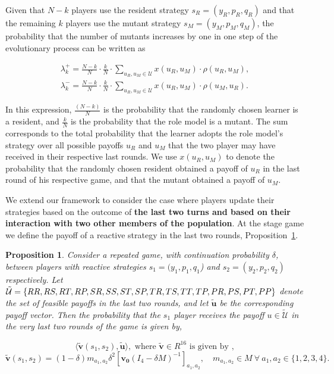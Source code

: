 \documentclass[11pt]{article}
\newcommand{\splitatcommas}[1]{%
  \begingroup
  \begingroup\lccode`~=`, \lowercase{\endgroup
    \edef~{\mathchar\the\mathcode`, \penalty0 \noexpand\hspace{0pt plus 1em}}%
  }\mathcode`,="8000 #1%
  \endgroup
}
\theoremstyle{plainCl1}
\newtheorem{Prop}{Proposition}
\theoremstyle{plainCl2}
\begin{document}
Given that $N\!-\!k$ players use the resident strategy $s_{R}\!=\!(y_{R},p_{R},q_{R})$
and that the remaining $k$ players use the mutant strategy
$s_{M}\!=\!(y_{M},p_{M},q_{M})$, the probability that the number of mutants increases by
one in one step of the evolutionary process can be written as

\begin{align}
\lambda^+_k=\frac{N\!-\!k}{N}\cdot \frac{k}{N}\cdot \sum_{u_{R},u_{M}\in\mathcal{U}} x(u_{R},u_{M})\cdot \rho(u_{R},u_{M}), \\
\lambda^-_k=\frac{N\!-\!k}{N}\cdot \frac{k}{N}\cdot \sum_{u_{R},u_{M}\in\mathcal{U}} x(u_{R},u_{M})\cdot \rho(u_{M},u_{R}).
\end{align}

In this expression, $\frac{(N\!-\!k)}{N}$ is the probability that the randomly chosen
learner is a resident, and $\frac{k}{N}$ is the probability that the role model is a
mutant. The sum corresponds to the total probability that the learner adopts the
role model's strategy over all possible payoffs $u_R$ and $u_M$ that the two
player may have received in their respective last rounds. We use $x(u_R,u_M)$ to
denote the probability that the randomly chosen resident obtained a payoff of
$u_R$ in the last round of his respective game, and that the mutant obtained a
payoff of $u_M$.

We extend our framework to consider the case where players update their
strategies based on the outcome of \textbf{the last two turns and based on their
interaction with two other members of the population}. At the stage game we
define the payoff of a reactive strategy in the last two rounds,
Proposition~\ref{proposition:last_two_rounds}.

\begin{Prop}\label{proposition:last_two_rounds}
  Consider a repeated game, with continuation probability $\delta$, between
  players with reactive strategies $s_1\!=\!(y_1, p_1, q_1$)  and
  $s_2\!=\!(y_2,p_2,q_2)$ respectively. Let $\mathcal{\tilde{U}} =
  \splitatcommas{\{RR, RS, RT, RP, SR, SS, ST, SP, TR, TS, TT, TP, PR, PS, PT,
  PP\}}$ denote the set of feasible payoffs in the last two rounds, and let
  \(\tilde{\mathbf{u}}\) be the corresponding payoff vector. Then the
  probability that the $s_1$ player receives the payoff $u\!\in\!
  \mathcal{\tilde{U}}$ in the very last two rounds of the game is given by,

  \begin{equation}
  \langle\mathbf{\tilde{v}}(s_1,s_2),\mathbf{\tilde{u}}\rangle, \text{ where } \mathbf{\tilde{v}} \in R^{16} \text{ is given by },
  \end{equation}
  \begin{equation}
    \mathbf{\tilde{v}}(s_1,s_2) = (1 - \delta) m_{a_1, a_2} \delta^2 \left[\mathbf{v_0}(I_4 - \delta M)^{-1}\right]_{a_1, a_2}, \quad  m_{a_1, a_2} \in M \ \forall \ a_1, a_2 \in \{1, 2, 3, 4\}.
  \end{equation}
\end{Prop}
\end{document}
